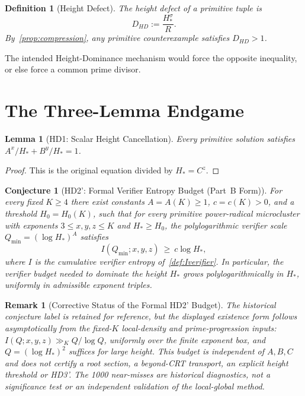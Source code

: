 \documentclass[11pt,a4paper]{article}
\newtheorem{lemma}[theorem]{Lemma}
\newtheorem{conjecture}[theorem]{Conjecture}
\newtheorem{definition}[theorem]{Definition}
\newtheorem{remark}[theorem]{Remark}
\begin{document}
\begin{definition}[Height Defect]
The height defect of a primitive tuple is
\[
  D_{HD} := \frac{H_*^{\sigma}}{R}.
\]
By~\cref{prop:compression}, any primitive counterexample satisfies
$D_{HD}>1$.
\end{definition}

The intended Height-Dominance mechanism would force the opposite
inequality, or else force a common prime divisor.

\section{The Three-Lemma Endgame}

\begin{lemma}[HD1: Scalar Height Cancellation]
\label{lem:hd1}
Every primitive solution satisfies
$A^x/H_* + B^y/H_* = 1$.
\end{lemma}

\begin{proof}
This is the original equation divided by $H_*=C^z$.
\end{proof}

\begin{conjecture}[HD2': Formal Verifier Entropy Budget (Part~B Form)]
\label{conj:hd2prime}
For every fixed $K \ge 4$ there exist constants $A=A(K) \ge 1$,
$c=c(K) > 0$, and a threshold $H_{0}=H_{0}(K)$, such that for every
primitive power-radical microcluster with exponents $3 \le x,y,z \le K$
and $H_* \ge H_{0}$, the polylogarithmic verifier scale
$Q_{\min} = (\log H_*)^{A}$ satisfies
\[
  I(Q_{\min};x,y,z) \ \ge\ c \log H_*,
\]
where $I$ is the cumulative verifier entropy of~\cref{def:Iverifier}.
In particular, the verifier budget needed to dominate the height
$H_*$ grows polylogarithmically in $H_*$, uniformly in admissible
exponent triples.
\end{conjecture}

\begin{remark}[Corrective Status of the Formal HD2' Budget]
The historical conjecture label is retained for reference, but the displayed
existence form follows asymptotically from the fixed-$K$ local-density and
prime-progression inputs: $I(Q;x,y,z)\gg_K Q/\log Q$, uniformly over the
finite exponent box, and $Q=(\log H_*)^2$ suffices for large height.
This budget is independent of $A,B,C$ and does not certify a root section,
a beyond-CRT transport, an explicit height threshold or HD3'.
The 1000 near-misses are historical diagnostics, not a significance test
or an independent validation of the local-global method.
\end{remark}
\end{document}
